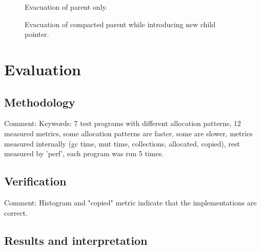 \documentclass[a4paper,oneside]{memoir}
\newcommand{\makecomment}[1]{{\color{red} Comment: #1}}
\begin{document}
\begin{figure}[b]
  
  \caption{Evacuation of parent only.}
  \label{multiple_parents}
\end{figure}


\begin{figure}
  
  \caption{Evacuation of compacted parent while introducing new child pointer.}
  \label{parent_no_child}
\end{figure}





\chapter{Evaluation}

\section{Methodology}
\makecomment{Keywords: 7 test programs with different allocation patterns, 12 measured metrics,
some allocation patterns are faster, some are slower, metrics measured internally
(gc time, mut time, collections, allocated, copied), rest measured
by 'perf', each program was run 5 times.}

\section{Verification}

\makecomment{Histogram and "copied" metric indicate that the implementations
are correct.}

\section{Results and interpretation}
\end{document}

